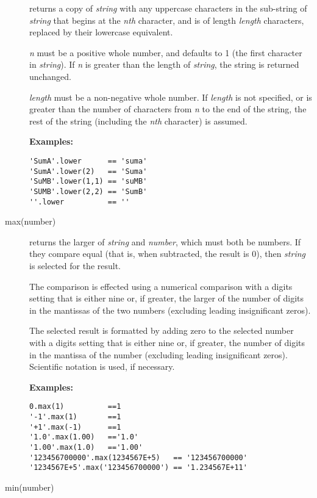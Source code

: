 \begin{description}
returns a copy of \emph{string} with any uppercase characters in
the sub-string of \emph{string} that begins at the \emph{n}\emph{th}
character, and is of length \emph{length} characters, replaced by
their lowercase equivalent.
 
\emph{n} must be a positive whole number, and defaults to 1 (the
first character in \emph{string}).  If \emph{n} is greater than
the length of \emph{string}, the string is returned unchanged.
 
\emph{length} must be a non-negative whole number.
If \emph{length} is not specified, or is greater than the number of
characters from \emph{n} to the end of the string, the rest of the
string (including the \emph{n}\emph{th} character) is assumed.
 
\textbf{Examples:}
\begin{lstlisting}
'SumA'.lower      == 'suma'
'SumA'.lower(2)   == 'Suma'
'SuMB'.lower(1,1) == 'suMB'
'SUMB'.lower(2,2) == 'SumB'
''.lower          == ''
\end{lstlisting}
\item[max(number)]\label{refmax}

returns the larger of \emph{string} and \emph{number}, which
must both be numbers.  If they compare equal (that is, when subtracted,
the result is 0), then \emph{string} is selected for the result.
 
The comparison is effected using a numerical comparison with a digits
setting that is either nine or, if greater, the larger of the number of
digits in the mantissas of the two numbers (excluding leading
insignificant zeros).
 
The selected result is formatted by adding zero to the selected number
with a digits setting that is either nine or, if greater, the number of
digits in the mantissa of the number (excluding leading insignificant
zeros).
Scientific notation is used, if necessary.
 
\textbf{Examples:}
\begin{lstlisting}
0.max(1)          ==1
'-1'.max(1)       ==1
'+1'.max(-1)      ==1
'1.0'.max(1.00)   =='1.0'
'1.00'.max(1.0)   =='1.00'
'123456700000'.max(1234567E+5)   == '123456700000'
'1234567E+5'.max('123456700000') == '1.234567E+11'
\end{lstlisting}
\item[min(number)]\label{refmin}


\end{description}
